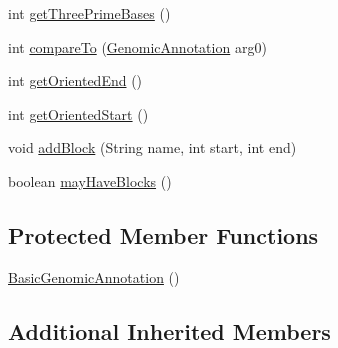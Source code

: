 \begin{DoxyCompactItemize}
\item 
int \hyperlink{classbroad_1_1core_1_1annotation_1_1_basic_genomic_annotation_a0fb40ec2fb50f82f09ce0c80049a0e25}{get\+Three\+Prime\+Bases} ()
\item 
int \hyperlink{classbroad_1_1core_1_1annotation_1_1_basic_genomic_annotation_af2945eb5b4eda18596aa43ee1ef6293c}{compare\+To} (\hyperlink{interfacebroad_1_1core_1_1annotation_1_1_genomic_annotation}{Genomic\+Annotation} arg0)
\item 
int \hyperlink{classbroad_1_1core_1_1annotation_1_1_basic_genomic_annotation_a7928fb714b0f90833b6d5852ac6ff207}{get\+Oriented\+End} ()
\item 
int \hyperlink{classbroad_1_1core_1_1annotation_1_1_basic_genomic_annotation_a54aa0c6d854d7f5935dbc70e9de0e2c9}{get\+Oriented\+Start} ()
\item 
void \hyperlink{classbroad_1_1core_1_1annotation_1_1_basic_genomic_annotation_a9b9345f670efef10abcb26c4f7972320}{add\+Block} (String name, int start, int end)
\item 
boolean \hyperlink{classbroad_1_1core_1_1annotation_1_1_basic_genomic_annotation_a9c77dd64d9f5aa93e5e5a41429581205}{may\+Have\+Blocks} ()
\end{DoxyCompactItemize}
\subsection*{Protected Member Functions}
\begin{DoxyCompactItemize}
\item 
\hyperlink{classbroad_1_1core_1_1annotation_1_1_basic_genomic_annotation_a882be76550b1c3bad5b6b89585b4d3a4}{Basic\+Genomic\+Annotation} ()
\end{DoxyCompactItemize}
\subsection*{Additional Inherited Members}


